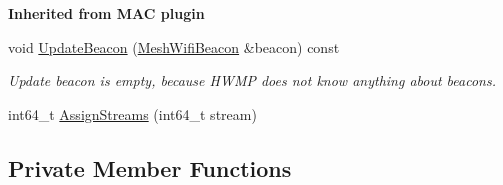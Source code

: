 \begin{Indent}{\bf Inherited from M\+AC plugin}
\begin{DoxyCompactItemize}
void \hyperlink{classns3_1_1dot11s_1_1HwmpProtocolMac_a55d5af33e670796c6739ebe57f2bb9f0}{Update\+Beacon} (\hyperlink{classns3_1_1MeshWifiBeacon}{Mesh\+Wifi\+Beacon} \&beacon) const 
\begin{DoxyCompactList}\small\item\em Update beacon is empty, because H\+W\+MP does not know anything about beacons. \end{DoxyCompactList}\item 
int64\+\_\+t \hyperlink{classns3_1_1dot11s_1_1HwmpProtocolMac_ae7142f36a3ba5adf5dfac19579a03b4b}{Assign\+Streams} (int64\+\_\+t stream)
\end{DoxyCompactItemize}
\end{Indent}
\subsection*{Private Member Functions}
